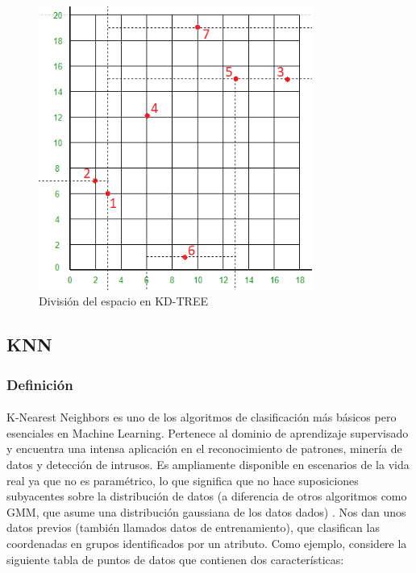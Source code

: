 \documentclass{article}
\begin{document}
\begin{figure}[h!]
	\centering
	\includegraphics[width=0.8\textwidth]{img/kdtree_2.png}
	\caption{División del espacio en KD-TREE}
	\label{fig:kdtree_02}
\end{figure}

\subsection{KNN}
\subsubsection{Definición}
\paragraph{}
K-Nearest Neighbors es uno de los algoritmos de clasificación más básicos pero esenciales en Machine Learning. Pertenece al dominio de aprendizaje supervisado y encuentra una intensa aplicación en el reconocimiento de patrones, minería de datos y detección de intrusos.
Es ampliamente disponible en escenarios de la vida real ya que no es paramétrico, lo que significa que no hace suposiciones subyacentes sobre la distribución de datos (a diferencia de otros algoritmos como GMM, que asume una distribución gaussiana de los datos dados) .
Nos dan unos datos previos (también llamados datos de entrenamiento), que clasifican las coordenadas en grupos identificados por un atributo.
Como ejemplo, considere la siguiente tabla de puntos de datos que contienen dos características:
\end{document}
